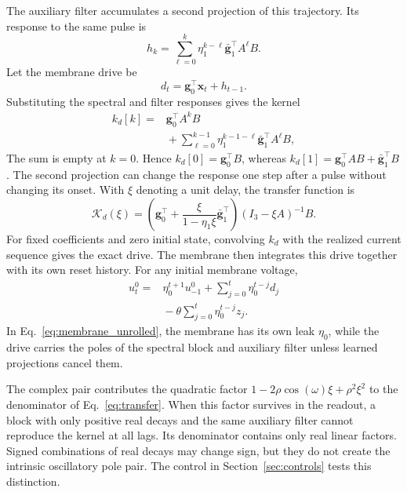 \documentclass[letterpaper,journal]{IEEEtran}
\begin{document}
The auxiliary filter accumulates a second projection of this trajectory. Its response to the same pulse is
\begin{equation}
h_k=\sum_{\ell=0}^{k}\eta_1^{k-\ell}
                \bar{\mathbf g}_1^\top A^\ell B.
\label{eq:h_kernel}
\end{equation}
Let the membrane drive be
\begin{equation}
d_t=\mathbf g_0^\top\mathbf x_t+h_{t-1}.
\label{eq:drive}
\end{equation}
Substituting the spectral and filter responses gives the kernel
\begin{equation}
\begin{aligned}
k_d[k]={}&\mathbf g_0^\top A^kB\\
&{}+\sum_{\ell=0}^{k-1}\eta_1^{k-1-\ell}
                       \bar{\mathbf g}_1^\top A^\ell B ,
\end{aligned}
\label{eq:drive_kernel}
\end{equation}
The sum is empty at $k=0$. Hence $k_d[0]=\mathbf g_0^\top B$, whereas $k_d[1]=\mathbf g_0^\top AB+\bar{\mathbf g}_1^\top B$. The second projection can change the response one step after a pulse without changing its onset. With $\xi$ denoting a unit delay, the transfer function is
\begin{equation}
\mathcal K_d(\xi)=
\left(\mathbf g_0^\top+
\frac{\xi}{1-\eta_1\xi}\bar{\mathbf g}_1^\top\right)
(I_3-\xi A)^{-1}B.
\label{eq:transfer}
\end{equation}
For fixed coefficients and zero initial state, convolving $k_d$ with the realized current sequence gives the exact drive. The membrane then integrates this drive together with its own reset history. For any initial membrane voltage,
\begin{equation}
\begin{aligned}
u_t^0={}&\eta_0^{t+1}u_{-1}^0
+\sum_{j=0}^{t}\eta_0^{t-j}d_j\\
&{}-\theta\sum_{j=0}^{t}\eta_0^{t-j}z_j .
\end{aligned}
\label{eq:membrane_unrolled}
\end{equation}
In Eq.~\eqref{eq:membrane_unrolled}, the membrane has its own leak $\eta_0$, while the drive carries the poles of the spectral block and auxiliary filter unless learned projections cancel them.

The complex pair contributes the quadratic factor $1-2\rho\cos(\omega)\xi+\rho^2\xi^2$ to the denominator of Eq.~\eqref{eq:transfer}. When this factor survives in the readout, a block with only positive real decays and the same auxiliary filter cannot reproduce the kernel at all lags. Its denominator contains only real linear factors. Signed combinations of real decays may change sign, but they do not create the intrinsic oscillatory pole pair. The control in Section~\ref{sec:controls} tests this distinction.
\end{document}
